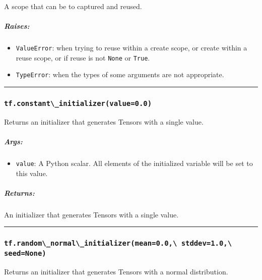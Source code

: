 A scope that can be to captured and reused.

\subparagraph{Raises: }\label{raises-7}

\begin{itemize}
\tightlist
\item
  \lstinline{ValueError}: when trying to reuse within a create scope, or
  create within a reuse scope, or if reuse is not \lstinline{None} or
  \lstinline{True}.
\item
  \lstinline{TypeError}: when the types of some arguments are not
  appropriate.
\end{itemize}

\begin{center}\rule{0.5\linewidth}{\linethickness}\end{center}

\subsubsection{\texorpdfstring{\lstinline{tf.constant\_initializer(value=0.0)}
}{tf.constant\_initializer(value=0.0) }}\label{tf.constantux5finitializervalue0.0}

Returns an initializer that generates Tensors with a single value.

\subparagraph{Args: }\label{args-18}

\begin{itemize}
\tightlist
\item
  \lstinline{value}: A Python scalar. All elements of the initialized
  variable will be set to this value.
\end{itemize}

\subparagraph{Returns: }\label{returns-20}

An initializer that generates Tensors with a single value.

\begin{center}\rule{0.5\linewidth}{\linethickness}\end{center}

\subsubsection{\texorpdfstring{\lstinline{tf.random\_normal\_initializer(mean=0.0,\ stddev=1.0,\ seed=None)}
}{tf.random\_normal\_initializer(mean=0.0, stddev=1.0, seed=None) }}\label{tf.randomux5fnormalux5finitializermean0.0-stddev1.0-seednone}

Returns an initializer that generates Tensors with a normal
distribution.

